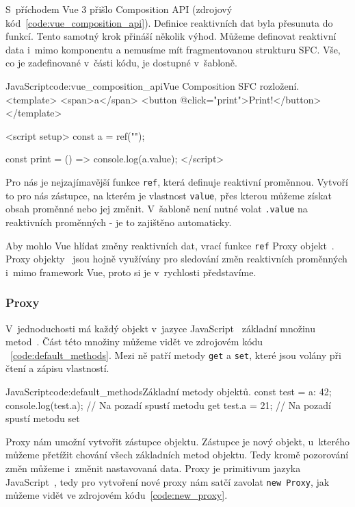 \documentclass[
  master,
  program=ainf,
  printversion,
  tables=false,
  sourcecodes,
  glossaries,
  index
]{kidiplom}
\begin{document}
S~příchodem Vue 3 přišlo Composition API (zdrojový kód~\ref{code:vue_composition_api}). 
Definice reaktivních dat byla přesunuta do funkcí. Tento samotný krok přináší několik výhod. Můžeme 
definovat reaktivní data i~mimo komponentu a nemusíme mít fragmentovanou strukturu SFC. Vše, co je
zadefinované v~části kódu, je dostupné v~šabloně. 


  \begin{kicode}{JavaScript}{code:vue_composition_api}{Vue Composition SFC rozložení.}
    <template>
      <span>{{a}}</span>
      <button @click="print">Print!</button>
    </template>
  
    <script setup>
      const a = ref("");
  
      const print = () => {
        console.log(a.value);
      }
    </script>
  \end{kicode}
  
Pro nás je nejzajímavější funkce {\tt ref}, která definuje reaktivní proměnnou.
Vytvoří to pro nás zástupce, na kterém je vlastnost {\tt value}, přes kterou můžeme
získat obsah proměnné nebo jej změnit. V~šabloně není nutné volat {\tt .value} na
reaktivních proměnných - je to zajištěno automaticky.

Aby mohlo Vue hlídat změny reaktivních dat, vrací funkce {\tt ref} Proxy objekt~\cite{proxy}. Proxy
objekty~\cite{proxy} jsou hojně využívány pro sledování změn reaktivních proměnných i~mimo framework
Vue, proto si je v~rychlosti představíme.

\subsubsection{Proxy}

V~jednoduchosti má každý objekt v~jazyce JavaScript~\cite{js} základní množinu metod~\cite{default_methods}. Část této množiny můžeme vidět
ve zdrojovém kódu ~\ref{code:default_methods}.
Mezi ně patří metody {\tt get} a {\tt set}, které jsou volány při čtení a zápisu vlastností.

\begin{kicode}{JavaScript}{code:default_methods}{Základní metody objektů.}
  const test = {a: 42};
  console.log(test.a); // Na pozadí spustí metodu get
  test.a = 21; // Na pozadí spustí metodu set
\end{kicode}

Proxy nám umožní vytvořit zástupce objektu. Zástupce je nový objekt, u~kterého
můžeme přetížit chování všech základních metod objektu. Tedy kromě pozorování 
změn můžeme i~změnit nastavovaná data. Proxy je primitivum jazyka JavaScript~\cite{js}, tedy
pro vytvoření nové proxy nám satčí zavolat {\tt new Proxy}, jak můžeme vidět ve zdrojovém kódu~\ref{code:new_proxy}.
\end{document}
